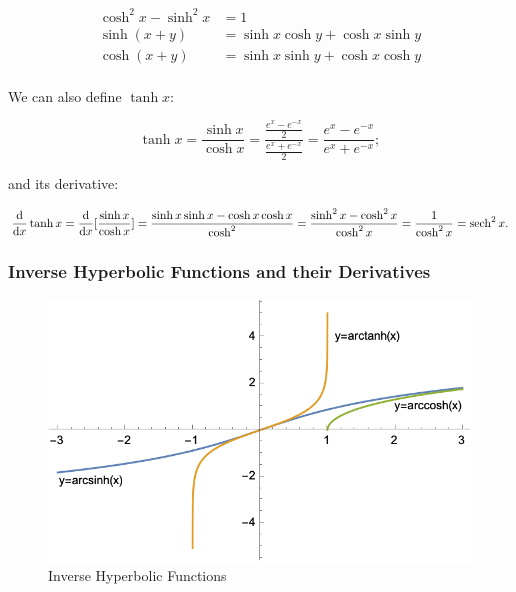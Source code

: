 \documentclass[12pt]{article}
\begin{document}
\begin{equation}
    \begin{split}
        \cosh^2 x - \sinh^2 x &= 1\\
        \sinh(x+y) &= \sinh x \cosh y + \cosh x \sinh y\\
        \cosh(x+y) &= \sinh x \sinh y + \cosh x \cosh y\\
    \end{split}
\end{equation}

We can also define $\tanh x$:

$$\tanh x = \frac{\sinh x}{\cosh x} = \frac{\frac{e^x-e^{-x}}{2}}{\frac{e^x+e^{-x}}{2}}=\frac{e^x-e^{-x}}{e^x+e^{-x}};$$

and its derivative:


$$\ddx \tanh x = \ddx [\frac{\sinh x}{\cosh x}] = \frac{\sinh x \sinh x - \cosh x \cosh x}{\cosh^2} = \frac{\sinh^2 x - \cosh^2 x}{\cosh^2 x} = \frac{1}{\cosh^2 x} = \sech^2 x.$$

\subsubsection{Inverse Hyperbolic Functions and their Derivatives}

\begin{figure}[!ht]
    \centering
    \includegraphics{misc/inversehyperbolic.png}
    \caption{Inverse Hyperbolic Functions}
    \label{inversehyperbolic}
\end{figure}
\end{document}
